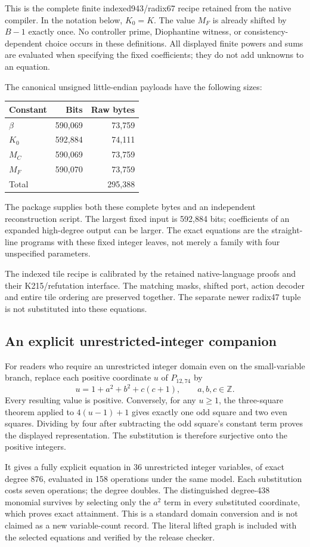 This is the complete finite indexed943/radix67 recipe retained from the
native compiler. In the notation below, $K_0=K$. The value $M_F$ is
already shifted by $B-1$ exactly once. No controller prime, Diophantine
witness, or consistency-dependent choice occurs in these definitions.
All displayed finite powers and sums are evaluated when specifying
the fixed coefficients; they do not add unknowns to an equation.

The canonical unsigned little-endian payloads have the following sizes:
\begin{center}\small
\begin{tabular}{@{}lrr@{}}
\toprule
Constant & Bits & Raw bytes\\
\midrule
$\beta$ &590,069&73,759\\
$K_0$ &592,884&74,111\\
$M_C$ &590,069&73,759\\
$M_F$ &590,070&73,759\\
\midrule
Total&&295,388\\
\bottomrule
\end{tabular}
\end{center}
The package supplies both these complete bytes and an independent
reconstruction script. The largest fixed input is 592,884 bits;
coefficients of an expanded high-degree output can be larger.
The exact equations are the straight-line programs with these fixed
integer leaves, not merely a family with four unspecified parameters.

\begingroup\small

\endgroup

The indexed tile recipe is calibrated by the retained native-language
proofs and their K215/refutation interface. The matching masks, shifted
port, action decoder and entire tile ordering are preserved together.
The separate newer radix47 tuple is not substituted into these equations.

\subsection*{An explicit unrestricted-integer companion}

For readers who require an unrestricted integer domain even on the
small-variable branch, replace each positive coordinate $u$ of
$P_{12,74}$ by
\[
 u=1+a^2+b^2+c(c+1),\qquad a,b,c\in\mathbb Z.
\]
Every resulting value is positive. Conversely, for any $u\ge1$,
the three-square theorem applied to $4(u-1)+1$ gives exactly one
odd square and two even squares. Dividing by four after subtracting
the odd square's constant term proves the displayed representation.
The substitution is therefore surjective onto the positive integers.

It gives a fully explicit equation in 36 unrestricted integer variables,
of exact degree 876, evaluated in 158 operations under the same model.
Each substitution costs seven operations; the degree doubles. The
distinguished degree-438 monomial survives by selecting only the $a^2$
term in every substituted coordinate, which proves exact attainment.
This is a standard domain conversion and is not claimed as a new
variable-count record. The literal lifted graph is included with the
selected equations and verified by the release checker.
